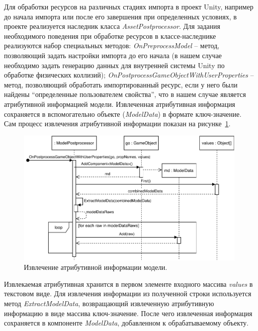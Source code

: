 Для обработки ресурсов на различных стадиях импорта в проект Unity,
например до начала импорта или после его завершения при определенных условиях,
в проекте реализуется наследник класса \emph{AssetPostprocessor}.
Для задания необходимого поведения при обработке ресурсов
в классе-наследнике реализуются набор специальных методов:
\emph{OnPreprocessModel} -- метод, позволяющий задать настройки импорта до его начала
(в нашем случае необходимо задать генерацию данных для внутренней
системы Unity по обработке физических коллизий);
\emph{OnPostprocessGameObjectWithUserProperties} -- метод, позволяющий
обработать импортированный ресурс, если у него были найдены
``определенные пользователем свойства'', что в нашем случае
является атрибутивной информацией модели.
Извлеченная атрибутивная информация сохраняется в вспомогательно объекте
(\emph{ModelData}) в формате ключ-значение.
Сам процесс извлечения атрибутивной информации показан
на рисунке~\ref{figure:SPostprocessor}.

\begin{figure}[ht]
    \centering
    \includegraphics[width=1.0\textwidth]{images/UML-SPostprocessor.pdf}
    \caption{Извлечение атрибутивной информации модели.}
    \label{figure:SPostprocessor}
\end{figure}

Извлекаемая атрибутивная хранится в первом элементе
входного массива \emph{values} в текстовом виде.
Для извлечения информации из полученной строки используется метод
\emph{ExtractModelData}, возвращающий извлеченную атрибутивную информацию
в виде массива ключ-значение.
После чего извлеченная информация сохраняется в компоненте \emph{ModelData},
добавленном к обрабатываемому объекту.
